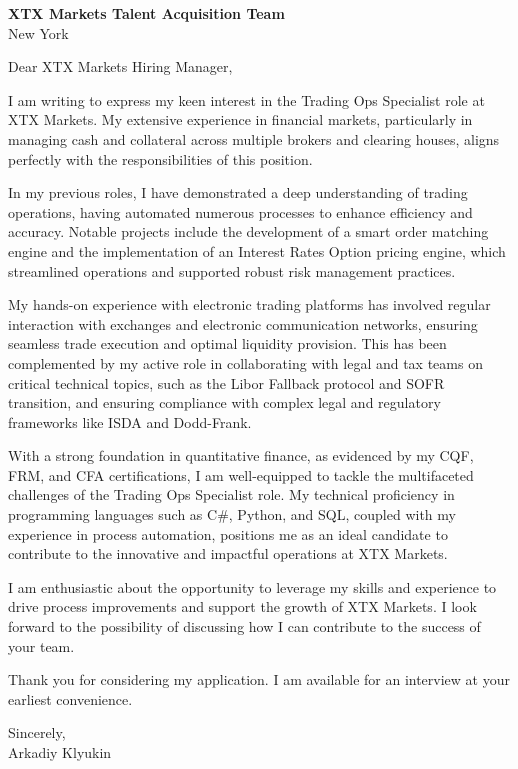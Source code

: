 \documentclass{letter}
\begin{document}
\begin{letter}{\textbf{XTX Markets Talent Acquisition Team} \\
                
                New York }


\opening{Dear XTX Markets Hiring Manager,}

I am writing to express my keen interest in the Trading Ops Specialist role at XTX Markets. My extensive experience in financial markets, particularly in managing cash and collateral across multiple brokers and clearing houses, aligns perfectly with the responsibilities of this position.

In my previous roles, I have demonstrated a deep understanding of trading operations, having automated numerous processes to enhance efficiency and accuracy. Notable projects include the development of a smart order matching engine and the implementation of an Interest Rates Option pricing engine, which streamlined operations and supported robust risk management practices.

My hands-on experience with electronic trading platforms has involved regular interaction with exchanges and electronic communication networks, ensuring seamless trade execution and optimal liquidity provision. This has been complemented by my active role in collaborating with legal and tax teams on critical technical topics, such as the Libor Fallback protocol and SOFR transition, and ensuring compliance with complex legal and regulatory frameworks like ISDA and Dodd-Frank.

With a strong foundation in quantitative finance, as evidenced by my CQF, FRM, and CFA certifications, I am well-equipped to tackle the multifaceted challenges of the Trading Ops Specialist role. My technical proficiency in programming languages such as C#, Python, and SQL, coupled with my experience in process automation, positions me as an ideal candidate to contribute to the innovative and impactful operations at XTX Markets.

I am enthusiastic about the opportunity to leverage my skills and experience to drive process improvements and support the growth of XTX Markets. I look forward to the possibility of discussing how I can contribute to the success of your team.

Thank you for considering my application. I am available for an interview at your earliest convenience.

Sincerely,\\
Arkadiy Klyukin
\end{letter}
\end{document}
